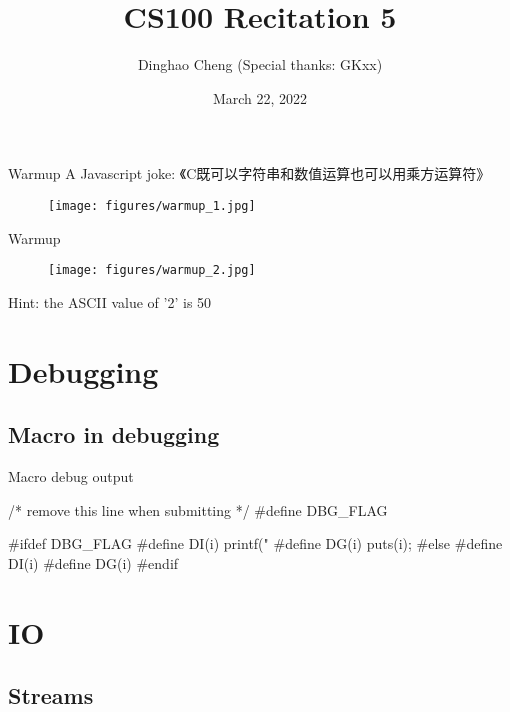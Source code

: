 \documentclass{beamer}
\title{CS100 Recitation 5}
\author{Dinghao Cheng (Special thanks: GKxx)}
\date{March 22, 2022}
\theoremstyle{definition}
\begin{document}
\begin{frame}
    \titlepage
\end{frame}

\begin{frame}{Warmup}
    A Javascript joke:
    《C既可以字符串和数值运算也可以用乘方运算符》
    \begin{figure}[h]
        \centering
        \texttt{[image: figures/warmup\_1.jpg]}
    \end{figure}
\end{frame}

\begin{frame}{Warmup}
    \begin{figure}[h]
        \centering
        \texttt{[image: figures/warmup\_2.jpg]}
    \end{figure}
    \pause
    Hint: the ASCII value of '2' is 50
\end{frame}

\section{Debugging}

\subsection{Macro in debugging}

\begin{frame}[fragile]{Macro debug output}
    \begin{cpp}
/* remove this line when submitting */
#define DBG_FLAG

#ifdef DBG_FLAG
#define DI(i) printf("%
#define DG(i) puts(i);
#else
#define DI(i)
#define DG(i)
#endif   
    \end{cpp}
\end{frame}

\section{IO}

\subsection{Streams}
\end{document}
